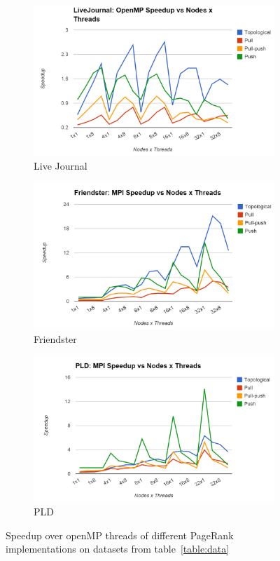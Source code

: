 \documentclass[letterpaper,11pt,onecolumn]{article}
\begin{document}
\begin{figure}
\begin{subfigure}{.33\textwidth}
  \centering
  \includegraphics[width=.99\linewidth]{LiveJournalOMPSpeedup}
  \caption{Live Journal}
  \label{fig:lgtime}
\end{subfigure}%
\begin{subfigure}{.33\textwidth}
  \centering
  \includegraphics[width=.99\linewidth]{FriendsterMPISpeedup}
  \caption{Friendster}
  \label{fig:ftime}
\end{subfigure}
\begin{subfigure}{.33\textwidth}
  \centering
  \includegraphics[width=.99\linewidth]{PLDMPISpeedup}
  \caption{PLD}
  \label{fig:ftime}
\end{subfigure}
\caption{Speedup over openMP threads of different PageRank implementations on datasets from table~\ref{table:data}}
\label{fig:spOMP}
\end{figure}
\end{document}
